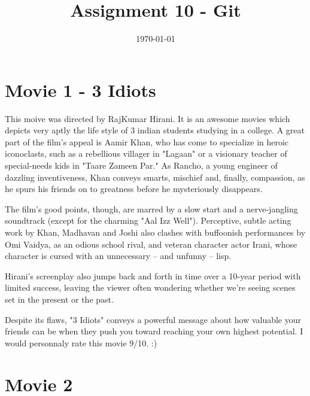 \documentclass[]{article}
\title{Assignment 10 - Git}
\date{\today}
\begin{document}
\maketitle
\section{Movie 1 - 3 Idiots}
This moive was directed by RajKumar Hirani. It is an awesome movies which depicts very aptly the life style of 3 indian students studying in a college.
A great part of the film's appeal is Aamir Khan, who has come to specialize in heroic iconoclasts, such as a rebellious villager in "Lagaan" or a visionary teacher of special-needs kids in "Taare Zameen Par." As Rancho, a young engineer of dazzling inventiveness, Khan conveys smarts, mischief and, finally, compassion, as he spurs his friends on to greatness before he mysteriously disappears.

The film's good points, though, are marred by a slow start and a nerve-jangling soundtrack (except for the charming "Aal Izz Well"). Perceptive, subtle acting work by Khan, Madhavan and Joshi also clashes with buffoonish performances by Omi Vaidya, as an odious school rival, and veteran character actor Irani, whose character is cursed with an unnecessary -- and unfunny -- lisp.

Hirani's screenplay also jumps back and forth in time over a 10-year period with limited success, leaving the viewer often wondering whether we're seeing scenes set in the present or the past.

Despite its flaws, "3 Idiots" conveys a powerful message about how valuable your friends can be when they push you toward reaching your own highest potential.
I would personnaly rate this movie 9/10. :)
\section{Movie 2}
\end{document}
